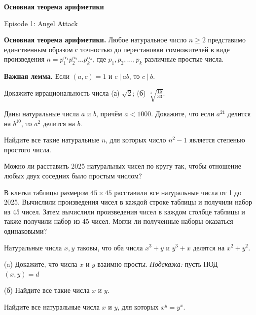 \centerline{\bf \Huge Основная теорема арифметики}


\begin{flushright}
        \scriptsize{Episode 1: Angel Attack}
\end{flushright}

\textbf{Основная теорема арифметики.} Любое натуральное число $n \geq 2$ представимо единственным образом с точностью до перестановки сомножителей в виде произведения $n=p_1^{\alpha_1} p_2^{\alpha_2} \ldots p_k^{\alpha_k}$, где $p_1, p_2, \ldots, p_k$ различные простые числа.

\noindent
\textbf{Важная лемма.} Если $(a,c)=1$ и $c\ |\ ab$, то $c\ | \ b$. 

Докажите иррациональность числа (а) $\sqrt{2}$; (б) $\sqrt[3]{\frac{16}{33}}$.

Даны натуральные числа $a$ и $b$, причём $a<1000$. Докажите, что если $a^{21}$ делится на $b^{10}$, то $a^2$ делится на $b$.

Найдите все такие натуральные $n$, для которых число $n^2-1$ является степенью простого числа.

Можно ли расставить 2025 натуральных чисел по кругу так, чтобы отношение любых двух соседних было простым числом?

В клетки таблицы размером $45 \times 45$ расставили все натуральные числа от 1 до 2025. Вычислили произведения чисел в каждой строке таблицы и получили набор из 45 чисел. Затем вычислили произведения чисел в каждом столбце таблицы и также получили набор из 45 чисел. Могли ли полученные наборы оказаться одинаковыми?

Натуральные числа $x, y$ таковы, что оба числа $x^3+y$ и $y^3+x$ делятся на $x^2+y^2$.

(a) Докажите, что числа $x$ и $y$ взаимно просты. \textit{Подсказка:} пусть НОД$(x,y) = d$

(б) Найдите все такие числа $x$ и $y$.

Найдите все натуральные числа $x$ и $y$, для которых $x^y=y^x$.
